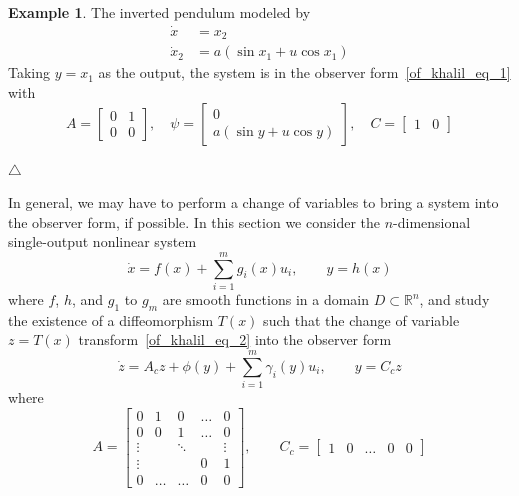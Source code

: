 \documentclass[11pt,a4paper,oneside]{book}
\numberwithin{equation}{section}
\theoremstyle{it}
\theoremstyle{definition}
\newtheorem{example}{Example}[section]
\begin{document}
\begin{example} The inverted pendulum modeled by
	\begin{equation*} 
		\begin{aligned}
			\dot{x} &= x_2 \\[6pt]
			\dot{x}_2 &= a(\sin x_1 + u\cos x_1)
		\end{aligned}
	\end{equation*}
Taking $y=x_1$ as the output, the system is in the observer form~\eqref{of_khalil_eq_1} with
\begin{equation*} 
	A=\begin{bmatrix} 0&1 \\[6pt] 0&0 \end{bmatrix},\quad\psi=\begin{bmatrix} 0 \\[6pt] a(\sin y + u\cos y)\end{bmatrix}, \quad C=\begin{bmatrix} 1&0
	\end{bmatrix}
\end{equation*} 

	\hfill$\triangle$
\end{example}
In general, we may have to perform a change of variables to bring a system into the observer form, if possible. In this section we consider the $n$-dimensional single-output nonlinear system
\begin{equation}\label{of_khalil_eq_2}
	\dot{x}=f(x)+\sum_{i=1}^{m}g_i(x)u_i,\qquad y=h(x)
\end{equation}
where $f$, $h$, and $g_1$ to $g_m$ are smooth functions in a domain $D\subset \mathbb{R}^n$, and study the existence of a diffeomorphism $T(x)$ such that the change of variable $z=T(x)$ transform~\eqref{of_khalil_eq_2} into the observer form
\begin{equation}\label{of_khalil_eq_2b}
	\dot{z}=A_cz+\phi(y) + \sum_{i=1}^{m}\gamma_i(y)u_i,\qquad y=C_cz
\end{equation}
where
\begin{equation*}
	A=\begin{bmatrix} 0&1&0&\dots&0 \\[6pt] 0&0&1&\dots&0 \\[6pt] \vdots& &\ddots& &\vdots \\[6pt] \vdots& & &0&1 \\[6pt] 0&\dots&\dots&0&0	\end{bmatrix},\qquad C_c=\begin{bmatrix} 1&0&\dots&0&0\end{bmatrix}
\end{equation*}
\end{document}
